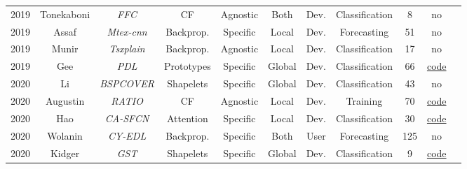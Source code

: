 \begin{table*}[h!]
\begin{tabular}{@{}ccccccccccc@{}}
    2019        & Tonekaboni\cite{tonekaboni_explaining_2019}&\textit{FFC}& CF&Agnostic    & Both          & Dev.      & Classification                           & 8                & no \\ 

    2019        & Assaf\cite{assaf_mtex-cnn_2019}                  &\textit{Mtex-cnn}  & Backprop.&Specific       & Local         & Dev.      & Forecasting                        & 51                & no\\ 

    2019        & Munir\cite{munir_tsxplain_2019}            &\textit{Tsxplain}  &  Backprop.    &Agnostic       & Local         & Dev.      & Classification                    & 17                & no\\  

    2019        & Gee\cite{gee_explaining_2019}        &\textit{PDL}       & Prototypes    &Specific       & Global        & Dev.      & Classification                    & 66                & \href{https://github.com/alangee/ijcai19-ts-prototypes}{code} \\ 

    2020        & Li\cite{li_efficient_2022}                   &\textit{\footnotesize{BSPCOVER}}  & Shapelets     & Specific      & Global        & Dev.      & Classification                    & 43               & no\\  

    2020        & Augustin\cite{augustin_adversarial_2020}&\textit{RATIO} & CF&Agnostic      & Local         & Dev.      & Training                          & 70                & \href{https://github.com/M4xim4l/InNOutRobustness}{code}\\ 
    
    2020        & Hao\cite{hao_new_2020}                 &\textit{CA-SFCN}   & Attention     &Specific       & Local         & Dev.      & Classification                    & 30                & \href{https://github.com/huipingcao/nmsu_yhao_ijcai2020}{code}\\ 

    2020        &   Wolanin\cite{wolanin_estimating_2020}       & \textit{CY-EDL}   & Backprop.     &Specific       & Both          & User   & Forecasting                          & 125               & no \\

    2020        & Kidger\cite{kidger_generalised_2020}& \textit{GST}      & Shapelets     &Specific       & Global        & Dev.      & Classification                    & 9                 & \href{https://github.com/patrick-kidger/generalised_shapelets}{code}\\  


\end{tabular}
\end{table*}
